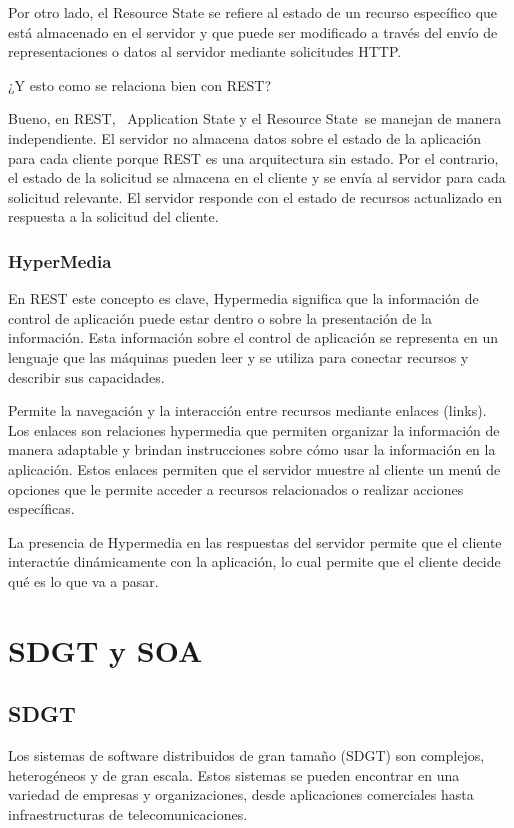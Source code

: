 \documentclass{article}
\begin{document}
		Por otro lado, el Resource State se refiere al estado de un recurso específico que está almacenado en el servidor y que puede ser modificado a través del envío de representaciones o datos al servidor mediante solicitudes HTTP.

		¿Y esto como se relaciona bien con REST? 
		
		Bueno, en REST,  Application State y el Resource State se manejan de manera independiente. El servidor no almacena datos sobre el estado de la aplicación para cada cliente porque REST es una arquitectura sin estado. Por el contrario, el estado de la solicitud se almacena en el cliente y se envía al servidor para cada solicitud relevante. El servidor responde con el estado de recursos actualizado en respuesta a la solicitud del cliente.
		
		\subsubsection{HyperMedia}
		
		En REST este concepto es clave, Hypermedia significa que la información de control de aplicación puede estar dentro o sobre la presentación de la información. Esta información sobre el control de aplicación se representa en un lenguaje que las máquinas pueden leer y se utiliza para conectar recursos y describir sus capacidades.
		
		Permite la navegación y la interacción entre recursos mediante enlaces (links). Los enlaces son relaciones hypermedia que permiten organizar la información de manera adaptable y brindan instrucciones sobre cómo usar la información en la aplicación. Estos enlaces permiten que el servidor muestre al cliente un menú de opciones que le permite acceder a recursos relacionados o realizar acciones específicas.
		
		La presencia de Hypermedia en las respuestas del servidor permite que el cliente interactúe dinámicamente con la aplicación, lo cual permite que el cliente decide qué es lo que va a pasar.
		
		
		
		\section{SDGT y SOA}
		
		\subsection{SDGT}
			Los sistemas de software distribuidos de gran tamaño (SDGT) son complejos, heterogéneos y de gran escala. Estos sistemas se pueden encontrar en una variedad de empresas y organizaciones, desde aplicaciones comerciales hasta infraestructuras de telecomunicaciones.
			
\end{document}
